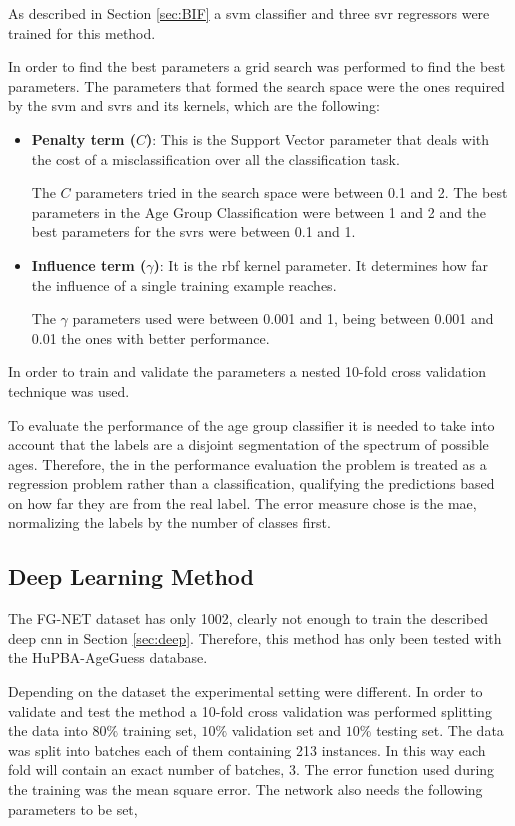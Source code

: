 As described in Section \ref{sec:BIF} a \gls{svm} classifier and three \gls{svr} regressors were trained for this method. 

In order to find the best parameters a grid search was performed to find the best parameters. The parameters that formed the search space were the ones required by the \gls{svm} and \glspl{svr} and its kernels, which are the following:

\begin{itemize}
	\item \textbf{Penalty term ($C$)}: This is the Support Vector parameter that deals with the cost of a misclassification over all the classification task. 
	
	The $C$ parameters tried in the search space were between 0.1 and 2. The best parameters in the Age Group Classification were between 1 and 2 and the best parameters for the \glspl{svr} were between 0.1 and 1.
	
	\item \textbf{Influence term ($\gamma$)}: It is the \gls{rbf} kernel parameter. It determines how far the influence of a single training example reaches.
	
	The $\gamma$ parameters used were between 0.001 and 1, being between 0.001 and 0.01 the ones with better performance.
\end{itemize}

In order to train and validate the parameters a nested 10-fold cross validation technique was used.

To evaluate the performance of the age group classifier it is needed to take into account that the labels are a disjoint segmentation of the spectrum of possible ages. Therefore, the in the performance evaluation the problem is treated as a regression problem rather than a classification, qualifying the predictions based on how far they are from the real label. The error measure chose is the \gls{mae}, normalizing the labels by the number of classes first.

\subsection{Deep Learning Method}

The FG-NET dataset has only 1002, clearly not enough to train the described deep \gls{cnn} in Section \ref{sec:deep}. Therefore, this method has only been tested with the HuPBA-AgeGuess database.

Depending on the dataset the experimental setting were different. In order to validate and test the method a 10-fold cross validation was performed splitting the data into $80\%$ training set, $10\%$ validation set and $10\%$ testing set. The data was split into batches each of them containing 213 instances. In this way each fold will contain an exact number of batches, 3. The error function used during the training was the mean square error. The network also needs the following parameters to be set,

